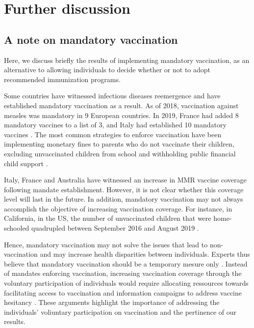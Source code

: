 \section{Further discussion}


\subsection{A note on mandatory vaccination}

Here, we discuss briefly the results of implementing mandatory vaccination, as an alternative to allowing individuals to decide whether or not to adopt recommended immunization programs.

Some countries have witnessed infectious diseases reemergence and have established mandatory vaccination as a result. As of 2018, vaccination against measles was mandatory in 9 European countries. In 2019, France had added 8 mandatory vaccines to a list of 3, and Italy had established 10 mandatory vaccines \cite[]{Bechini2019}. The most common strategies to enforce vaccination have been implementing monetary fines to parents who do not vaccinate their children, excluding unvaccinated children from school \cite[]{Drew2019,Bechini2019} and withholding public financial child support \cite[]{Drew2019,Australia2015}.

Italy, France and Australia have witnessed an increase in MMR vaccine coverage following mandate establishment. However, it is not clear whether this coverage level will last in the future. In addition, mandatory vaccination may not always accomplish the objective of increasing vaccination coverage. For instance, in California, in the US, the number of unvaccinated children that were home-schooled quadrupled between September 2016 and August 2019 \cite[]{Drew2019}. 

Hence, mandatory vaccination may not solve the issues that lead to non-vaccination and may increase health disparities between individuals. Experts thus believe that mandatory vaccination should be a temporary mesure only \cite[]{Bechini2019}. Instead of mandates enforcing vaccination, increasing vaccination coverage through the voluntary participation of individuals would require allocating ressources towards facilitating access to vaccination and information campaigns to address vaccine hesitancy \cite[]{Drew2019,Bechini2019}. These arguments highlight the importance of addressing the individuals' voliuntary participation on vaccination and the pertinence of our results.